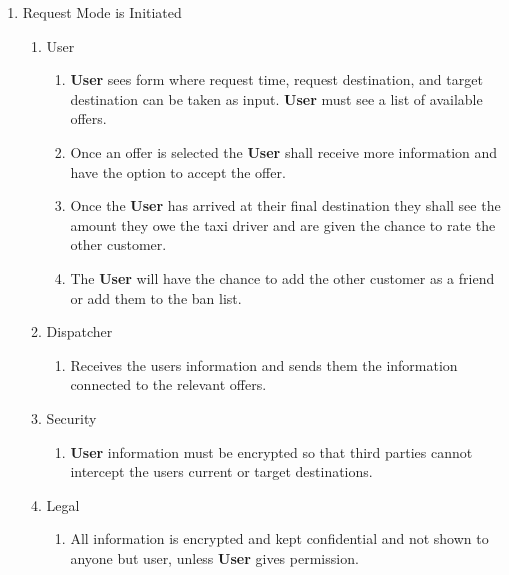 \documentclass[english]{article}
\begin{document}
\begin{enumerate}[{BE}1.]
	\item Request Mode is Initiated	
	\begin{enumerate}[{VP6}.1]
		\item User
			\begin{enumerate}
				\item \textbf{User} sees form where request time, request destination, and target destination can be taken as input. \textbf{User} must see a list of available offers. 
				\item Once an offer is selected the \textbf{User} shall receive more information and have the option to accept the offer. 
				\item Once the \textbf{User} has arrived at their final destination they shall see the amount they owe the taxi driver and are given the chance to rate the other customer. 
				\item The \textbf{User} will have the chance to add the other customer as a friend or add them to the ban list. 
			\end{enumerate}
		\item Dispatcher
			\begin{enumerate}
				\item Receives the users information and sends them the information connected to the relevant offers.
			\end{enumerate}
		\item Security
			\begin{enumerate}
				\item \textbf{User} information must be encrypted so that third parties cannot intercept the users current or target destinations.
			\end{enumerate}
		\item Legal
			\begin{enumerate}
				\item All information is encrypted and kept confidential and not shown to anyone but user, unless \textbf{User} gives permission.
			\end{enumerate}
	\end{enumerate}
	

\end{enumerate}
\end{document}
